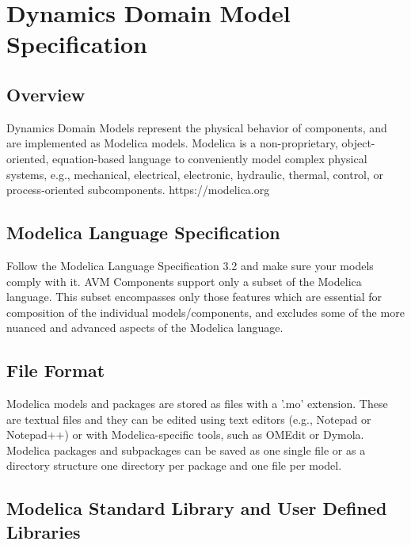 \section{Dynamics Domain Model Specification}


\subsection{Overview}

Dynamics Domain Models represent the physical behavior of components, and are implemented as Modelica models.
Modelica is a non-proprietary, object-oriented, equation-based language to conveniently model complex physical systems, e.g., mechanical, electrical, electronic, hydraulic, thermal, control, or process-oriented subcomponents. https://modelica.org

\subsection{Modelica Language Specification}
Follow the Modelica Language Specification 3.2 and make sure your models comply with it. AVM Components support only a subset of the Modelica language. This subset encompasses only those features which are essential for composition of the individual models/components, and excludes some
of the more nuanced and advanced aspects of the Modelica language.

\subsection{File Format}
Modelica models and packages are stored as files with a '.mo' extension. These are textual files and they can be edited using text editors (e.g., Notepad or Notepad++) or with Modelica-specific tools, such as OMEdit or Dymola. Modelica packages and subpackages can be saved as one single file or as a directory structure one directory per package and one file per model. 

\subsection{Modelica Standard Library and User Defined Libraries}

